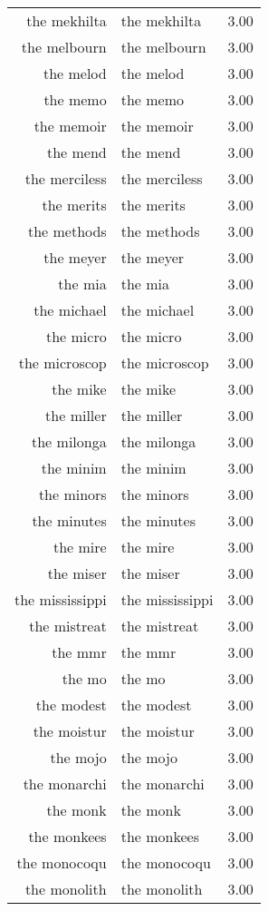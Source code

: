 \begin{table}[ht]
\begin{tabular}{rlr}
  the mekhilta & the mekhilta & 3.00 \\ 
  the melbourn & the melbourn & 3.00 \\ 
  the melod & the melod & 3.00 \\ 
  the memo & the memo & 3.00 \\ 
  the memoir & the memoir & 3.00 \\ 
  the mend & the mend & 3.00 \\ 
  the merciless & the merciless & 3.00 \\ 
  the merits & the merits & 3.00 \\ 
  the methods & the methods & 3.00 \\ 
  the meyer & the meyer & 3.00 \\ 
  the mia & the mia & 3.00 \\ 
  the michael & the michael & 3.00 \\ 
  the micro & the micro & 3.00 \\ 
  the microscop & the microscop & 3.00 \\ 
  the mike & the mike & 3.00 \\ 
  the miller & the miller & 3.00 \\ 
  the milonga & the milonga & 3.00 \\ 
  the minim & the minim & 3.00 \\ 
  the minors & the minors & 3.00 \\ 
  the minutes & the minutes & 3.00 \\ 
  the mire & the mire & 3.00 \\ 
  the miser & the miser & 3.00 \\ 
  the mississippi & the mississippi & 3.00 \\ 
  the mistreat & the mistreat & 3.00 \\ 
  the mmr & the mmr & 3.00 \\ 
  the mo & the mo & 3.00 \\ 
  the modest & the modest & 3.00 \\ 
  the moistur & the moistur & 3.00 \\ 
  the mojo & the mojo & 3.00 \\ 
  the monarchi & the monarchi & 3.00 \\ 
  the monk & the monk & 3.00 \\ 
  the monkees & the monkees & 3.00 \\ 
  the monocoqu & the monocoqu & 3.00 \\ 
  the monolith & the monolith & 3.00 \\ 

\end{tabular}
\end{table}
